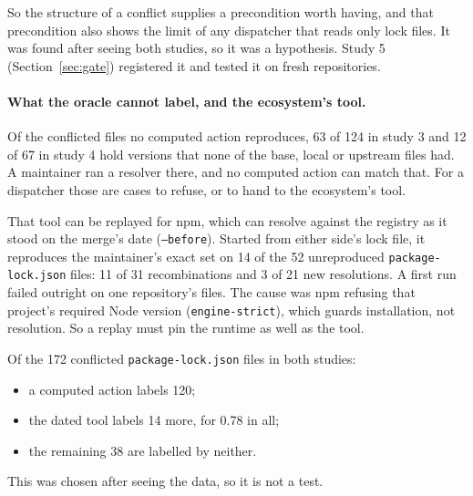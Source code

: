 \documentclass[11pt]{article}
\newcommand{\code}[1]{\texttt{#1}}
\begin{document}
So the structure of a conflict supplies a precondition worth having, and that precondition also
shows the limit of any dispatcher that reads only lock files. It was found after seeing both
studies, so it was a hypothesis. Study 5 (Section~\ref{sec:gate}) registered it and tested it on
fresh repositories.

\paragraph{What the oracle cannot label, and the ecosystem's tool.}
Of the conflicted files no computed action reproduces, 63 of 124 in study 3 and 12 of 67 in study
4 hold versions that none of the base, local or upstream files had. A maintainer ran a resolver
there, and no computed action can match that. For a dispatcher those are cases to refuse, or to
hand to the ecosystem's tool.

That tool can be replayed for npm, which can resolve against the registry as it stood on the
merge's date (\code{--before}). Started from either side's lock file, it reproduces the
maintainer's exact set on 14 of the 52 unreproduced \code{package-lock.json} files: 11 of 31
recombinations and 3 of 21 new resolutions. A first run failed outright on one repository's
files. The cause was npm refusing that project's required Node version (\code{engine-strict}),
which guards installation, not resolution. So a replay must pin the runtime as well as the tool.

Of the 172 conflicted \code{package-lock.json} files in both studies:
\begin{itemize}
  \item a computed action labels 120;
  \item the dated tool labels 14 more, for 0.78 in all;
  \item the remaining 38 are labelled by neither.
\end{itemize}
This was chosen after seeing the data, so it is not a test.
\end{document}

